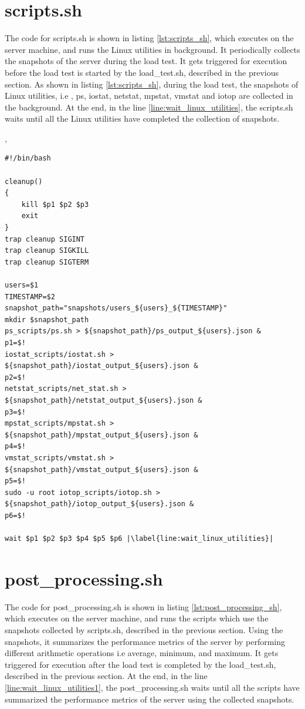 \documentclass{iitbreport}
\begin{document}
\section{scripts.sh}
The code for scripts.sh is shown in listing \ref{lst:scripts_sh}, which executes on the server machine, and runs the Linux utilities in background. It periodically collects the snapshots of the server during the load test. It gets triggered for execution before the load test is started by the load\_test.sh, described in the previous section. As shown in  listing \ref{lst:scripts_sh}, during the load test, the snapshots of Linux utilities, i.e , ps, iostat, netstat, mpstat, vmstat and iotop are collected in the background. At the end, in the line \ref{line:wait_linux_utilities}, the  scripts.sh waits until all the Linux utilities have completed the collection of snapshots.


\lstset{language=bash}
\lstset{frame=lines}
\lstset{breaklines=true}
\lstset{numbers=left,
    stepnumber=1}
    
,

\begin{lstlisting}[escapechar=|]
#!/bin/bash

cleanup()
{
	kill $p1 $p2 $p3
	exit
}
trap cleanup SIGINT
trap cleanup SIGKILL
trap cleanup SIGTERM

users=$1
TIMESTAMP=$2
snapshot_path="snapshots/users_${users}_${TIMESTAMP}"
mkdir $snapshot_path
ps_scripts/ps.sh > ${snapshot_path}/ps_output_${users}.json &
p1=$!
iostat_scripts/iostat.sh > ${snapshot_path}/iostat_output_${users}.json &
p2=$!
netstat_scripts/net_stat.sh > ${snapshot_path}/netstat_output_${users}.json &
p3=$!
mpstat_scripts/mpstat.sh > ${snapshot_path}/mpstat_output_${users}.json &
p4=$!
vmstat_scripts/vmstat.sh > ${snapshot_path}/vmstat_output_${users}.json &
p5=$!
sudo -u root iotop_scripts/iotop.sh > ${snapshot_path}/iotop_output_${users}.json &
p6=$!

wait $p1 $p2 $p3 $p4 $p5 $p6 |\label{line:wait_linux_utilities}|
\end{lstlisting}


\section{post\_processing.sh}

The code for post\_processing.sh is shown in listing \ref{lst:post_processing_sh}, which executes on the server machine, and runs the scripts which use the snapshots collected by scripts.sh, described in the previous section. Using the snapshots, it summarizes the performance metrics of the server by performing different arithmetic operations i.e average, minimum, and maximum. It gets triggered for execution after the load test is completed by the load\_test.sh, described in the previous section. At the end, in  the line \ref{line:wait_linux_utilities1}, the  post\_processing.sh waits until all the scripts have summarized the performance metrics of the server using the collected snapshots.
\end{document}
